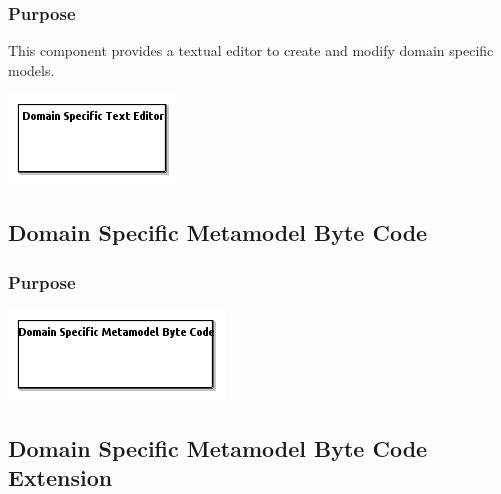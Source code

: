 \documentclass{gemoc} %
\begin{document}

\subsubsection{Purpose}
This component provides a textual editor to create and modify domain specific models.
\begin{center}
\includegraphics*[trim=0.0cm 0.0cm 0cm 0.0cm, clip=true]{../images/generated/Generated_Domain_Specific_Text_Editor.png}
\end{center}



\subsection{Domain Specific Metamodel Byte Code}


\subsubsection{Purpose}

\begin{center}
\includegraphics*[trim=0.0cm 0.0cm 0cm 0.0cm, clip=true]{../images/generated/Generated_Domain_Specific_Metamodel_Byte_Code.png}
\end{center}



\subsection{Domain Specific Metamodel Byte Code Extension}
\end{document}
